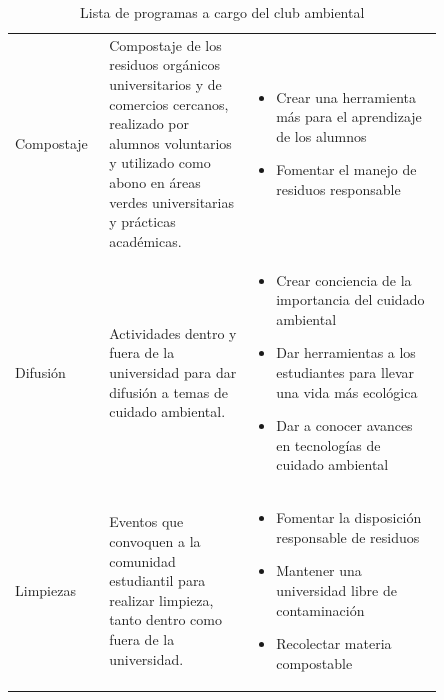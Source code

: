 \begin{table}\centering
    \caption{Lista de programas a cargo del club ambiental}
    \label{tab:porgramas_del_club_ambiental}
    {\tabstyle
    \begin{tabular}{M{0.15\linewidth}M{0.3\linewidth}M{0.4\linewidth}}\hline
         &  &  \\ \hline

        Compostaje 
        &
        Compostaje de los residuos orgánicos universitarios y de comercios cercanos, realizado por alumnos voluntarios y utilizado como abono en áreas verdes universitarias y prácticas académicas.
        &
        \begin{itemize}
            \item Crear una herramienta más para el aprendizaje de los alumnos
            \item Fomentar el manejo de residuos responsable
        \end{itemize} 
        \\

        Difusión 
        &
        Actividades dentro y fuera de la universidad para dar difusión a temas de cuidado ambiental.
        &
        \begin{itemize}
            \item Crear conciencia de la importancia del cuidado ambiental
            \item Dar herramientas a los estudiantes para llevar una vida más ecológica
            \item Dar a conocer avances en tecnologías de cuidado ambiental
        \end{itemize} 
        \\

        Limpiezas
        &
        Eventos que convoquen a la comunidad estudiantil para realizar limpieza, tanto dentro como fuera de la universidad.
        &
        \begin{itemize}
            \item Fomentar la disposición responsable de residuos
            \item Mantener una universidad libre de contaminación
            \item Recolectar materia compostable
        \end{itemize} 
        \\


\end{tabular}}
\end{table}
